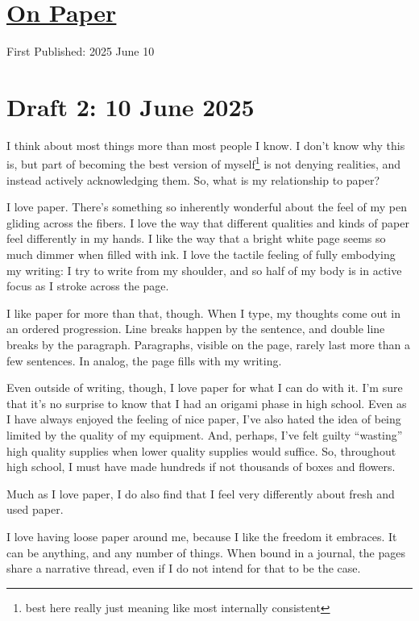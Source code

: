 \documentclass[12pt]{article}
\newcommand{\say}[1]{``#1''}
\renewcommand{\,}{\textsuperscript{,}}
\begin{document}
  
\doublespacing  
\section{\href{paper.html}{On Paper}}  
First Published: 2025 June 10

\section{Draft 2: 10 June 2025}

I think about most things more than most people I know.  
I don't know why this is, but part of becoming the best version of myself\footnote{best here really just meaning like most internally consistent} is not denying realities, and instead actively acknowledging them.  
So, what is my relationship to paper?

I love paper.  
There's something so inherently wonderful about the feel of my pen gliding across the fibers.  
I love the way that different qualities and kinds of paper feel differently in my hands.  
I like the way that a bright white page seems so much dimmer when filled with ink.  
I love the tactile feeling of fully embodying my writing: I try to write from my shoulder, and so half of my body is in active focus as I stroke across the page.

I like paper for more than that, though.  
When I type, my thoughts come out in an ordered progression.  
Line breaks happen by the sentence, and double line breaks by the paragraph.  
Paragraphs, visible on the page, rarely last more than a few sentences.  
In analog, the page fills with my writing.

Even outside of writing, though, I love paper for what I can do with it.  
I'm sure that it's no surprise to know that I had an origami phase in high school.  
Even as I have always enjoyed the feeling of nice paper, I've also hated the idea of being limited by the quality of my equipment.  
And, perhaps, I've felt guilty \say{wasting} high quality supplies when lower quality supplies would suffice.  
So, throughout high school, I must have made hundreds if not thousands of boxes and flowers.

Much as I love paper, I do also find that I feel very differently about fresh and used paper.

I love having loose paper around me, because I like the freedom it embraces.  
It can be anything, and any number of things.  
When bound in a journal, the pages share a narrative thread, even if I do not intend for that to be the case.
\end{document}
